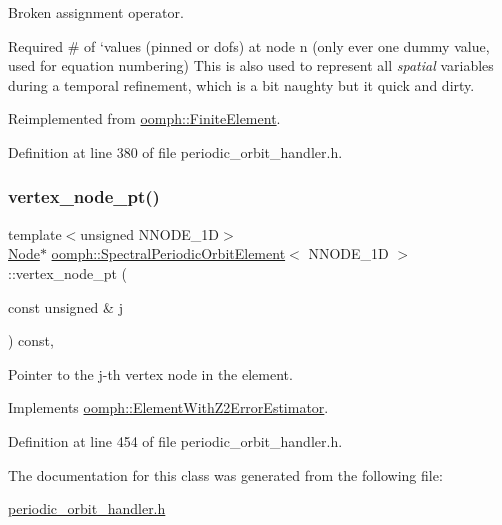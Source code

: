 Broken assignment operator. 

Required \# of `values\textquotesingle{} (pinned or dofs) at node n (only ever one dummy value, used for equation numbering) This is also used to represent all {\itshape spatial} variables during a temporal refinement, which is a bit naughty but it quick and dirty. 

Reimplemented from \hyperlink{classoomph_1_1FiniteElement_a56610c60d5bc2d7c27407a1455471b1a}{oomph\+::\+Finite\+Element}.



Definition at line 380 of file periodic\+\_\+orbit\+\_\+handler.\+h.

\mbox{\label{classoomph_1_1SpectralPeriodicOrbitElement_a1bcd63d9abbf001bf4beb903a18dfc2e}} 
\subsubsection{\texorpdfstring{vertex\+\_\+node\+\_\+pt()}{vertex\_node\_pt()}}
{\footnotesize\ttfamily template$<$unsigned N\+N\+O\+D\+E\+\_\+1D$>$ \\
\hyperlink{classoomph_1_1Node}{Node}$\ast$ \hyperlink{classoomph_1_1SpectralPeriodicOrbitElement}{oomph\+::\+Spectral\+Periodic\+Orbit\+Element}$<$ N\+N\+O\+D\+E\+\_\+1D $>$\+::vertex\+\_\+node\+\_\+pt (\begin{DoxyParamCaption}\item[{const unsigned \&}]{j }\end{DoxyParamCaption}) const\hspace{0.3cm}{\ttfamily [inline]}, {\ttfamily [virtual]}}



Pointer to the j-\/th vertex node in the element. 



Implements \hyperlink{classoomph_1_1ElementWithZ2ErrorEstimator_a0eedccc33519f852c5dc2055ddf2774b}{oomph\+::\+Element\+With\+Z2\+Error\+Estimator}.



Definition at line 454 of file periodic\+\_\+orbit\+\_\+handler.\+h.



The documentation for this class was generated from the following file\+:\begin{DoxyCompactItemize}
\item 
\hyperlink{periodic__orbit__handler_8h}{periodic\+\_\+orbit\+\_\+handler.\+h}\end{DoxyCompactItemize}
